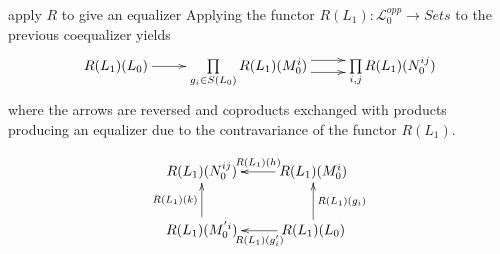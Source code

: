 \begin{frame}
\begin{block}{apply $R$ to give an equalizer}
Applying the functor $R(L_1): \mathcal{L}_0^{opp} \rightarrow Sets$ to the previous coequalizer yields
\begin{displaymath}
\xymatrix{
R(L_1)(L_0) \ar[r]
&
\prod\limits_{g_i \in S(L_0)} R(L_1)(M_0^i)
\ar@<1ex>[r]^-{} \ar@<-1ex>[r]_-{}
&
\prod\limits_{i,j} R(L_1)(N_0^{ij})
}
\end{displaymath}
where the arrows are reversed and coproducts exchanged with products producing an equalizer due to the contravariance of the functor $R(L_1)$. 
\end{block}
\begin{displaymath}
\xymatrix{
R(L_1)(N_0^{ij}) & R(L_1)(M_0^i) \ar[l]_-{R(L_1)(h)} \\
R(L_1)(M_0^{'i}) \ar[u]^-{R(L_1)(k)} & R(L_1)(L_0) \ar[u]_-{R(L_1)(g_i)} \ar[l]^-{R(L_1)(g'_i)}
}
\end{displaymath}
\end{frame}
